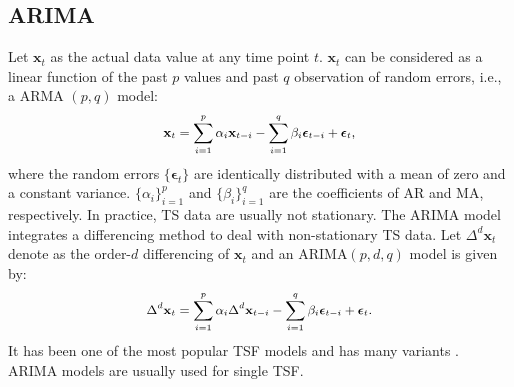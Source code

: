 \documentclass[letterpaper]{article} %
\numberwithin{theorem}{section}
\begin{document}
\subsection{ARIMA}

Let  $\mathbf x_t$ as the actual data value at any time point  $t$.   $\mathbf x_t$ can be considered as a linear function of the past $p$  values and  past  $q$ observation of random errors, i.e., a   ARMA $(p,q)$ model:
\begin{equation}\label{eq:arma}
\small
\begin{aligned}
\mathbf x_t = \sum_{i=1}^{p}\alpha_i \mathbf x_{t-i} -  \sum_{i=1}^{q}  \beta_i \boldsymbol  \epsilon_{t-i}   +  \boldsymbol \epsilon_t,
\end{aligned}
\end{equation}
where  the  random errors $\{\boldsymbol \epsilon_t\}$ are identically distributed with a mean of zero and a constant variance.
$\{\alpha_i\}_{i=1}^{p}$ and $ \{\beta_i \}_{i=1}^{q}$ are the coefficients  of AR and MA, respectively.
In practice, TS data are usually not  stationary. The ARIMA model integrates a differencing method to deal with non-stationary TS data.
Let  $\Delta^d \mathbf x_t $ denote as the  order-$d$  differencing  of $ \mathbf x_t$ and  an ARIMA$(p,d,q)$ model is given by:
\begin{equation}\label{eq:arima}
\small
\begin{aligned}
\Delta^d  \mathbf x_t = \sum_{i=1}^{p}\alpha_i \Delta^d  \mathbf x_{t-i} -  \sum_{i=1}^{q}  \beta_i \boldsymbol  \epsilon_{t-i}   +  \boldsymbol \epsilon_t.
\end{aligned}
\end{equation}
It  has been one of the most popular TSF models and has  many variants  \cite{zhang2003time,khashei2011novel,liu2016online}.  ARIMA models are usually used  for   single  TSF.
\end{document}
